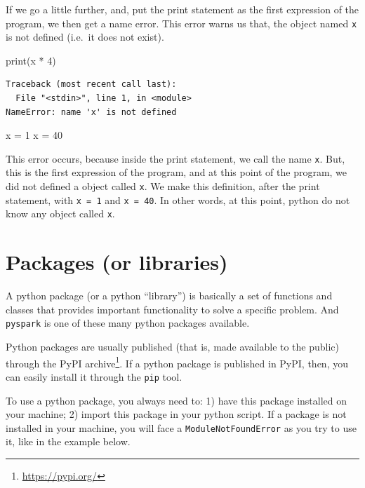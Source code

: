 \documentclass[
  11pt,
  letterpaper,
  DIV=11,
  numbers=noendperiod]{scrreprt}
\newenvironment{Shaded}{\begin{snugshade}}{\end{snugshade}}
\newcommand{\BuiltInTok}[1]{\textcolor[rgb]{0.00,0.23,0.31}{#1}}
\newcommand{\DecValTok}[1]{\textcolor[rgb]{0.68,0.00,0.00}{#1}}
\newcommand{\NormalTok}[1]{\textcolor[rgb]{0.00,0.23,0.31}{#1}}
\newcommand{\OperatorTok}[1]{\textcolor[rgb]{0.37,0.37,0.37}{#1}}
\begin{document}
If we go a little further, and, put the print statement as the first
expression of the program, we then get a name error. This error warns us
that, the object named \texttt{x} is not defined (i.e.~it does not
exist).

\begin{Shaded}
\begin{Highlighting}[]
\BuiltInTok{print}\NormalTok{(x }\OperatorTok{*} \DecValTok{4}\NormalTok{)}
\end{Highlighting}
\end{Shaded}

\begin{verbatim}
Traceback (most recent call last):
  File "<stdin>", line 1, in <module>
NameError: name 'x' is not defined
\end{verbatim}

\begin{Shaded}
\begin{Highlighting}[]
\NormalTok{x }\OperatorTok{=} \DecValTok{1}
\NormalTok{x }\OperatorTok{=} \DecValTok{40}
\end{Highlighting}
\end{Shaded}

This error occurs, because inside the print statement, we call the name
\texttt{x}. But, this is the first expression of the program, and at
this point of the program, we did not defined a object called
\texttt{x}. We make this definition, after the print statement, with
\texttt{x\ =\ 1} and \texttt{x\ =\ 40}. In other words, at this point,
python do not know any object called \texttt{x}.

\section{Packages (or libraries)}\label{packages-or-libraries}

A python package (or a python ``library'') is basically a set of
functions and classes that provides important functionality to solve a
specific problem. And \texttt{pyspark} is one of these many python
packages available.

Python packages are usually published (that is, made available to the
public) through the PyPI archive\footnote{\url{https://pypi.org/}}. If a
python package is published in PyPI, then, you can easily install it
through the \texttt{pip} tool.

To use a python package, you always need to: 1) have this package
installed on your machine; 2) import this package in your python script.
If a package is not installed in your machine, you will face a
\texttt{ModuleNotFoundError} as you try to use it, like in the example
below.
\end{document}
